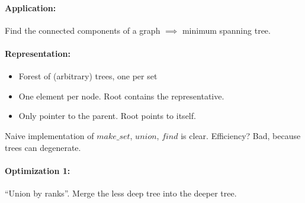 \paragraph{Application:} Find the connected components of a graph $\implies$ minimum spanning tree.

\paragraph{Representation: }
\begin{itemize}
\item Forest of (arbitrary) trees, one per set
\item One element per node. Root contains the representative.
\item Only pointer to the parent. Root points to itself.
\end{itemize}

Naive implementation of ${make\_set}$, ${union}$, ${find}$ is clear. Efficiency? Bad, because trees can degenerate.

\paragraph{Optimization 1: } ``Union by ranks''. Merge the less deep tree into the deeper tree.
